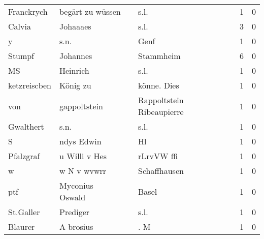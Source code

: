 \begin{center}
\begin{tiny}
\begin{longtabu}{llllrr}
               Franckrych &                   begärt zu wüssen &             &                                        s.l. &          1 &         0 \\
                   Calvia &                           Johaaaes &             &                                        s.l. &          3 &         0 \\
                        y &                               s.n. &             &                                        Genf &          1 &         0 \\
                   Stumpf &                           Johannes &             &                                   Stammheim &          6 &         0 \\
                       MS &                           Heinrich &             &                                        s.l. &          1 &         0 \\
             ketzreiscben &                           König zu &             &                                 könne. Dies &          1 &         0 \\
                      von &                       gappoltstein &             &                   Rappoltstein Ribeaupierre &          1 &         0 \\
                Gwalthert &                               s.n. &             &                                        s.l. &          1 &         0 \\
                        S &                         ndys Edwin &             &                                          Hl &          1 &         0 \\
                Pfalzgraf &                      u Willi v Hes &             &                                  rLrvVW ffi &          1 &         0 \\
                        w &                        w N v wvwrr &             &                                Schaffhausen &          1 &         0 \\
                      ptf &                    Myconius Oswald &             &                                       Basel &          1 &         0 \\
                St.Galler &                           Prediger &             &                                        s.l. &          1 &         0 \\
                  Blaurer &                          A brosius &             &                                         . M &          1 &         0 \\

\end{longtabu}
\end{tiny}
\end{center}
